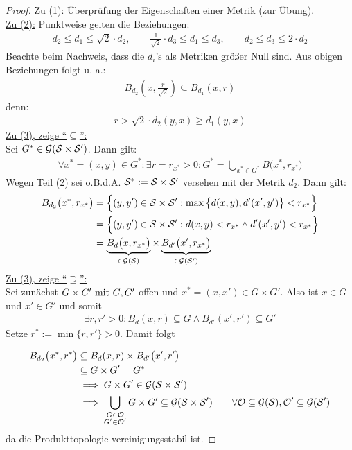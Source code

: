 \begin{proof}\enter
\underline{Zu (1):} Überprüfung der Eigenschaften einer Metrik (zur Übung).\\
\underline{Zu (2):} Punktweise gelten die Beziehungen:
\begin{align*}
d_2\leq d_1\leq\sqrt{2}\cdot d_2,\qquad
\frac{1}{\sqrt{2}}\cdot d_3\leq d_1\leq d_3,\qquad
d_2\leq d_3\leq 2\cdot d_2
\end{align*}
Beachte beim Nachweis, dass die $d_i$'s als Metriken größer Null sind. Aus obigen Beziehungen folgt u. a.:
\begin{align*}
B_{d_2}\left(x,\frac{r}{\sqrt{2}}\right)\subseteq B_{d_1}(x,r)
\end{align*}
denn:
\begin{align*}
r>\sqrt{2}\cdot d_2(y,x)\geq d_1(y,x)
\end{align*}
\underline{Zu (3), zeige ``$\subseteq$'':}\\
Sei $G^\ast\in\mathcal{G}(\S\times\S')$. Dann gilt:
\begin{align*}
\forall x^\ast=(x,y)\in G^\ast:\exists r=r_{x^\ast}>0:
G^\ast=\bigcup\limits_{x^\ast\in G^\ast} B\big(x^\ast,r_{x^\ast}\big)
\end{align*}
Wegen Teil (2) sei o.B.d.A. $\S^\ast:=\S\times\S'$ versehen mit der Metrik $d_2$. Dann gilt:
\begin{align*}
B_{d_2}\big(x^\ast,r_{x^\ast}\big)&=\Big\lbrace(y,y')\in \S\times\S':\max\big\lbrace d(x,y),d'(x',y')\big\rbrace<r_{x^\ast}\Big\rbrace\\
&=\Big\lbrace(y,y')\in\S\times\S':d(x,y)<r_{x^\ast}\wedge d'(x',y')<r_{x^\ast}\Big\rbrace\\
&= \underbrace{B_d\big(x,r_{x^\ast}\big)}_{\in\mathcal{G}(\S)}\times \underbrace{B_{d'}\big(x', r_{x^\ast}\big)}_{\in\mathcal{G}(\S')}
\end{align*}
\underline{Zu (3), zeige ``$\supseteq$'':}\\
Sei zunächst $G\times G'\mit G,G'$ offen und $x^\ast=(x,x')\in G\times G'$. Also ist $x\in G$ und $x'\in G'$ und somit
\begin{align*}
\exists r,r'>0:B_d(x,r)\subseteq G\wedge B_{d'}(x',r')\subseteq G'
\end{align*}
Setze $r^\ast:=\min\lbrace r,r'\rbrace>0$. Damit folgt

\begin{align*}
B_{d_2}\big( x^\ast,r^\ast\big)&\subseteq B_d(x,r)\times B_{d'}\big(x',r'\big)\\
&\subseteq
G\times G'=G^\ast\\
&\implies
G\times G'\in\mathcal{G}(\S\times\S')\\
&\implies
\bigcup\limits_{\begin{subarray}{c} G\in\mathcal{O}\\G'\in\mathcal{O}'\end{subarray}}G\times G'\subseteq\mathcal{G}(\S\times\S')
\qquad\forall\mathcal{O}\subseteq\mathcal{G}(\S),\mathcal{O}'\subseteq\mathcal{G}(\S')
\end{align*}
da die Produkttopologie vereinigungsstabil ist.
\end{proof}

